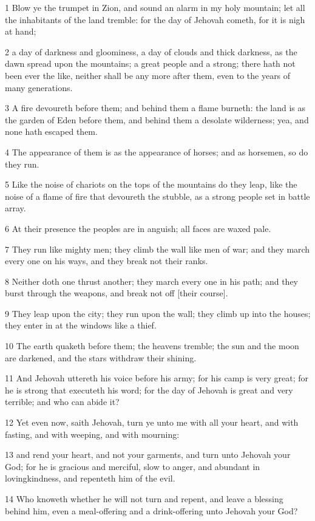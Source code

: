 \par 1 Blow ye the trumpet in Zion, and sound an alarm in my holy mountain; let all the inhabitants of the land tremble: for the day of Jehovah cometh, for it is nigh at hand;
\par 2 a day of darkness and gloominess, a day of clouds and thick darkness, as the dawn spread upon the mountains; a great people and a strong; there hath not been ever the like, neither shall be any more after them, even to the years of many generations.
\par 3 A fire devoureth before them; and behind them a flame burneth: the land is as the garden of Eden before them, and behind them a desolate wilderness; yea, and none hath escaped them.
\par 4 The appearance of them is as the appearance of horses; and as horsemen, so do they run.
\par 5 Like the noise of chariots on the tops of the mountains do they leap, like the noise of a flame of fire that devoureth the stubble, as a strong people set in battle array.
\par 6 At their presence the peoples are in anguish; all faces are waxed pale.
\par 7 They run like mighty men; they climb the wall like men of war; and they march every one on his ways, and they break not their ranks.
\par 8 Neither doth one thrust another; they march every one in his path; and they burst through the weapons, and break not off [their course].
\par 9 They leap upon the city; they run upon the wall; they climb up into the houses; they enter in at the windows like a thief.
\par 10 The earth quaketh before them; the heavens tremble; the sun and the moon are darkened, and the stars withdraw their shining.
\par 11 And Jehovah uttereth his voice before his army; for his camp is very great; for he is strong that executeth his word; for the day of Jehovah is great and very terrible; and who can abide it?
\par 12 Yet even now, saith Jehovah, turn ye unto me with all your heart, and with fasting, and with weeping, and with mourning:
\par 13 and rend your heart, and not your garments, and turn unto Jehovah your God; for he is gracious and merciful, slow to anger, and abundant in lovingkindness, and repenteth him of the evil.
\par 14 Who knoweth whether he will not turn and repent, and leave a blessing behind him, even a meal-offering and a drink-offering unto Jehovah your God?
